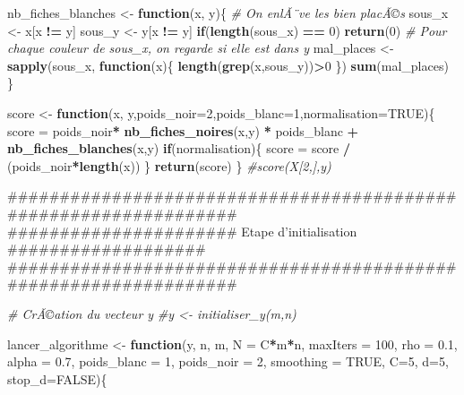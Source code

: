 \documentclass[]{article}
\newenvironment{Shaded}{\begin{snugshade}}{\end{snugshade}}
\newcommand{\CommentTok}[1]{\textcolor[rgb]{0.56,0.35,0.01}{\textit{#1}}}
\newcommand{\ControlFlowTok}[1]{\textcolor[rgb]{0.13,0.29,0.53}{\textbf{#1}}}
\newcommand{\DataTypeTok}[1]{\textcolor[rgb]{0.13,0.29,0.53}{#1}}
\newcommand{\DecValTok}[1]{\textcolor[rgb]{0.00,0.00,0.81}{#1}}
\newcommand{\FloatTok}[1]{\textcolor[rgb]{0.00,0.00,0.81}{#1}}
\newcommand{\KeywordTok}[1]{\textcolor[rgb]{0.13,0.29,0.53}{\textbf{#1}}}
\newcommand{\NormalTok}[1]{#1}
\newcommand{\OperatorTok}[1]{\textcolor[rgb]{0.81,0.36,0.00}{\textbf{#1}}}
\newcommand{\OtherTok}[1]{\textcolor[rgb]{0.56,0.35,0.01}{#1}}
\newcommand{\StringTok}[1]{\textcolor[rgb]{0.31,0.60,0.02}{#1}}
\begin{document}
\begin{Shaded}
\begin{Highlighting}[]
\NormalTok{nb_fiches_blanches <-}\StringTok{ }\ControlFlowTok{function}\NormalTok{(x, y)\{}
  \CommentTok{# On enlÃ¨ve les bien placÃ©s}
\NormalTok{  sous_x <-}\StringTok{ }\NormalTok{x[x }\OperatorTok{!=}\StringTok{ }\NormalTok{y]}
\NormalTok{  sous_y <-}\StringTok{ }\NormalTok{y[x }\OperatorTok{!=}\StringTok{ }\NormalTok{y]}
  \ControlFlowTok{if}\NormalTok{(}\KeywordTok{length}\NormalTok{(sous_x) }\OperatorTok{==}\StringTok{ }\DecValTok{0}\NormalTok{)}
    \KeywordTok{return}\NormalTok{(}\DecValTok{0}\NormalTok{)}
  \CommentTok{# Pour chaque couleur de sous_x, on regarde si elle est dans y }
\NormalTok{  mal_places <-}\StringTok{ }\KeywordTok{sapply}\NormalTok{(sous_x, }\ControlFlowTok{function}\NormalTok{(x)\{}
    \KeywordTok{length}\NormalTok{(}\KeywordTok{grep}\NormalTok{(x,sous_y))}\OperatorTok{>}\DecValTok{0}
\NormalTok{  \})}
  \KeywordTok{sum}\NormalTok{(mal_places)}
\NormalTok{\}}

\NormalTok{score <-}\StringTok{ }\ControlFlowTok{function}\NormalTok{(x, y,}\DataTypeTok{poids_noir=}\DecValTok{2}\NormalTok{,}\DataTypeTok{poids_blanc=}\DecValTok{1}\NormalTok{,}\DataTypeTok{normalisation=}\OtherTok{TRUE}\NormalTok{)\{}
\NormalTok{  score =}\StringTok{ }\NormalTok{poids_noir}\OperatorTok{*}\StringTok{ }\KeywordTok{nb_fiches_noires}\NormalTok{(x,y) }\OperatorTok{*}\StringTok{ }\NormalTok{poids_blanc }\OperatorTok{+}\StringTok{ }\KeywordTok{nb_fiches_blanches}\NormalTok{(x,y)}
  \ControlFlowTok{if}\NormalTok{(normalisation)\{}
\NormalTok{    score =}\StringTok{ }\NormalTok{score }\OperatorTok{/}\StringTok{ }\NormalTok{(poids_noir}\OperatorTok{*}\KeywordTok{length}\NormalTok{(x))   }
\NormalTok{  \}}
    \KeywordTok{return}\NormalTok{(score)}
\NormalTok{\}}
\CommentTok{#score(X[2,],y)}

\NormalTok{#################################################################}
\NormalTok{###################### Etape d'initialisation ###################}
\NormalTok{#################################################################}

\CommentTok{# CrÃ©ation du vecteur y }
\CommentTok{#y <- initialiser_y(m,n)}


\NormalTok{lancer_algorithme <-}\StringTok{ }\ControlFlowTok{function}\NormalTok{(y, n, m, }\DataTypeTok{N =}\NormalTok{ C}\OperatorTok{*}\NormalTok{m}\OperatorTok{*}\NormalTok{n, }\DataTypeTok{maxIters =} \DecValTok{100}\NormalTok{,}
                              \DataTypeTok{rho =} \FloatTok{0.1}\NormalTok{, }\DataTypeTok{alpha =} \FloatTok{0.7}\NormalTok{,}
                              \DataTypeTok{poids_blanc =} \DecValTok{1}\NormalTok{, }\DataTypeTok{poids_noir =} \DecValTok{2}\NormalTok{,}
                              \DataTypeTok{smoothing =} \OtherTok{TRUE}\NormalTok{, }\DataTypeTok{C=}\DecValTok{5}\NormalTok{, }\DataTypeTok{d=}\DecValTok{5}\NormalTok{, }\DataTypeTok{stop_d=}\OtherTok{FALSE}\NormalTok{)\{}
  

\end{Highlighting}
\end{Shaded}
\end{document}

